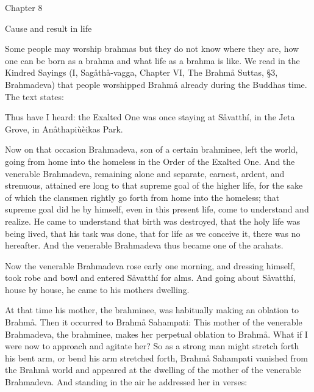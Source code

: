 \documentclass[12pt,twoside]{article}
\begin{document}
\bigskip


\bigskip

\clearpage
Chapter 8


\bigskip


\bigskip

Cause and result in life


\bigskip


\bigskip

Some people may worship brahmas but they do not know where they are, how
one can be born as a brahma and what life as a brahma is like. We read
in the Kindred Sayings (I, Sag{\aa}th{\aa}{}-vagga, Chapter VI, The
Brahm{\aa} Suttas, {\S}3, Brahmadeva) that people worshipped Brahm{\aa}
already during the Buddha{\textquotesingle}s time. The text states:


\bigskip

Thus have I heard: the Exalted One was once staying at S{\aa}vatth\'i,
in the Jeta Grove, in An{\aa}thapi\`u\`eika{\textquotesingle}s Park. 

Now on that occasion Brahmadeva, son of a certain brahminee, left the
world, going from home into the homeless in the Order of the Exalted
One. And the venerable Brahmadeva, remaining alone and separate,
earnest, ardent, and strenuous, attained ere long to that supreme goal
of the higher life, for the sake of which the clansmen rightly go forth
from home into the homeless; that supreme goal did he by himself, even
in this present life, come to understand and realize. He came to
understand that birth was destroyed, that the holy life was being
lived, that his task was done, that for life as we conceive it, there
was no hereafter. And the venerable Brahmadeva thus became one of the
arahats. 

Now the venerable Brahmadeva rose early one morning, and dressing
himself, took robe and bowl and entered S{\aa}vatth\'i for alms. And
going about S{\aa}vatth\'i, house by house, he came to his
mother{\textquotesingle}s dwelling. 

At that time his mother, the brahminee, was habitually making an
oblation to Brahm{\aa}. Then it occurred to Brahm{\aa} Sahampati:
{\textasciigrave}{\textasciigrave}This mother of the venerable
Brahmadeva, the brahminee, makes her perpetual oblation to Brahm{\aa}.
What if I were now to approach and agitate
her?{\textquotesingle}{\textquotesingle} So as a strong man might
stretch forth his bent arm, or bend his arm stretched forth, Brahm{\aa}
Sahampati vanished from the Brahm{\aa} world and appeared at the
dwelling of the mother of the venerable Brahmadeva. And standing in the
air he addressed her in verses:
\end{document}
